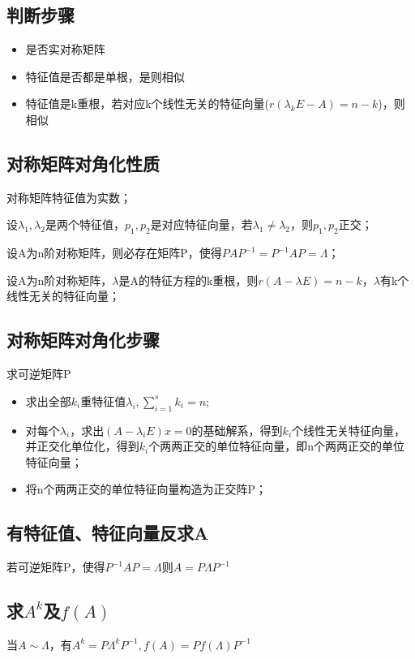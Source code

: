 \subsection{判断步骤}
\begin{itemize}
    \item 是否实对称矩阵
    \item 特征值是否都是单根，是则相似
    \item 特征值是k重根，若对应k个线性无关的特征向量(\(r(\lambda_kE - A) = n - k\))，则相似
\end{itemize}


\subsection{对称矩阵对角化性质}

对称矩阵特征值为实数；

设\(\lambda_1, \lambda_2\)是两个特征值，\(p_1, p_2\)是对应特征向量，若\(\lambda_1 \neq \lambda_2\)，则\(p_1,p_2\)正交；

设A为n阶对称矩阵，则必存在矩阵P，使得\(PAP^{-1} = P^{-1}AP = \Lambda\)；

设A为n阶对称矩阵，\(\lambda\)是A的特征方程的k重根，则\(r(A - \lambda E) = n - k\)，\(\lambda\)有k个线性无关的特征向量；

\subsection{对称矩阵对角化步骤}
求可逆矩阵P
\begin{itemize}
    \item 求出全部\(k_i\)重特征值\(\lambda_i, \displaystyle\sum_{i = 1}^s k_i = n\);
    \item 对每个\(\lambda_i\)，求出\((A - \lambda_iE)x = 0\)的基础解系，得到\(k_i\)个线性无关特征向量，并正交化单位化，得到\(k_i\)个两两正交的单位特征向量，即n个两两正交的单位特征向量；
    \item 将n个两两正交的单位特征向量构造为正交阵P；
\end{itemize}

\subsection{有特征值、特征向量反求A}
若可逆矩阵P，使得\(P^{-1}AP = \Lambda\)则\(A = P\Lambda P^{-1}\)

\subsection{求\(A^k\)及\(f(A)\)}
当\(A \sim \Lambda\)，有\(A^k = P\Lambda^kP^{-1}, f(A) = Pf(\Lambda)P^{-1}\)


